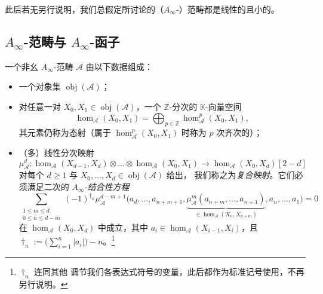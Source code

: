 
此后若无另行说明，我们总假定所讨论的（$A_\infty$-）范畴都是线性的且小的。

\subsection{$A_\infty$-范畴与 $A_\infty$-函子}\label{sec:2.2}

\begin{Def}\label{def:2.4}
一个非幺 $A_\infty$-范畴 $\mathcal A$ 由以下数据组成：
\begin{itemize}
  \item 一个对象集 $\operatorname{obj}(\mathcal A)$；
  \item 对任意一对 $X_0,X_1\in\operatorname{obj}(\mathcal A)$，一个 $\mathbb Z$-分次的
        $\mathbb K$-向量空间
        \[
          \hom_{\mathcal A}(X_0,X_1)=\bigoplus_{p\in\mathbb Z}
          \hom^p_{\mathcal A}(X_0,X_1),
        \]
        其元素仍称为态射（属于 $\hom^p_{\mathcal A}(X_0,X_1)$ 时称为 $p$ 次齐次的）；
  \item （多）线性分次映射
        \begin{equation}\label{eq:2.5}
          \mu^d_{\mathcal A}:\hom_{\mathcal A}(X_{d-1},X_d)\otimes\dots\otimes
          \hom_{\mathcal A}(X_0,X_1)\longrightarrow\hom_{\mathcal A}(X_0,X_d)[2-d]
        \end{equation}
        对每个 $d\ge 1$ 与 $X_0,\dots,X_d\in\operatorname{obj}(\mathcal A)$ 给出，
        我们称之为\emph{复合映射}。它们必须满足二次的 \emph{$A_\infty$-结合性方程}
        \begin{equation}\label{eq:2.6}
          \sum_{\substack{1\le m\le d\\ 0\le n\le d-m}}
          (-1)^{\dagger_n}\mu^{d-m+1}_{\mathcal A}\bigl(a_d,\dots,a_{n+m+1},
          \underbrace{\mu^m_{\mathcal A}(a_{n+m},\dots,a_{n+1})}
          _{\in\hom_{\mathcal A}(X_n,X_{n+m})},a_n,\dots,a_1\bigr)=0
        \end{equation}
        在 $\hom_{\mathcal A}(X_0,X_d)$ 中成立，其中
        $a_i\in\hom_{\mathcal A}(X_{i-1},X_i)$，且
        $\dagger_n:=\bigl(\sum_{i=1}^n|a_i|\bigr)-n$。\footnote{$\dagger_n$ 连同其他
        调节我们各表达式符号的变量，此后都作为标准记号使用，不再另行说明。}
\end{itemize}
\end{Def}

